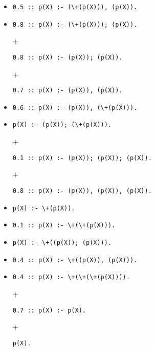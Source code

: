 \documentclass[letterpaper]{article}
\theoremstyle{definition}
\begin{document}
\begin{itemize}
\item
\begin{verbatim}
0.5 :: p(X) :- (\+(p(X))), (p(X)).
\end{verbatim}
\item
\begin{verbatim}
0.8 :: p(X) :- (\+(p(X))); (p(X)).
\end{verbatim}
\item[+]
\begin{verbatim}
0.8 :: p(X) :- (p(X)); (p(X)).
\end{verbatim}
\item[+]
\begin{verbatim}
0.7 :: p(X) :- (p(X)), (p(X)).
\end{verbatim}
\item
\begin{verbatim}
0.6 :: p(X) :- (p(X)), (\+(p(X))).
\end{verbatim}
\item
\begin{verbatim}
p(X) :- (p(X)); (\+(p(X))).
\end{verbatim}
\item[+]
\begin{verbatim}
0.1 :: p(X) :- (p(X)); (p(X)); (p(X)).
\end{verbatim}
\item[+]
\begin{verbatim}
0.8 :: p(X) :- (p(X)), (p(X)), (p(X)).
\end{verbatim}
\item
\begin{verbatim}
p(X) :- \+(p(X)).
\end{verbatim}
\item
\begin{verbatim}
0.1 :: p(X) :- \+(\+(p(X))).
\end{verbatim}
\item
\begin{verbatim}
p(X) :- \+((p(X)); (p(X))).
\end{verbatim}
\item
\begin{verbatim}
0.4 :: p(X) :- \+((p(X)), (p(X))).
\end{verbatim}
\item
\begin{verbatim}
0.4 :: p(X) :- \+(\+(\+(p(X)))).
\end{verbatim}
\item[+]
\begin{verbatim}
0.7 :: p(X) :- p(X).
\end{verbatim}
\item[+]
\begin{verbatim}
p(X).
\end{verbatim}
\end{itemize}
\end{document}
